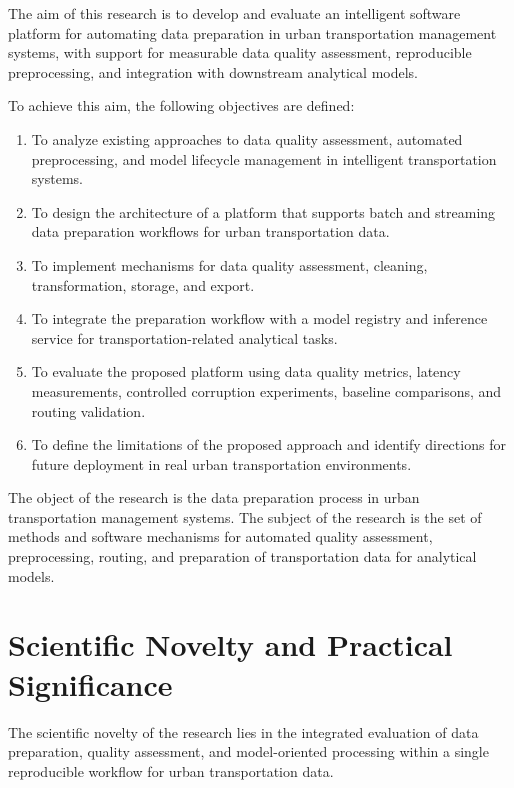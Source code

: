 The aim of this research is to develop and evaluate an intelligent software platform for automating data preparation in urban transportation management systems, with support for measurable data quality assessment, reproducible preprocessing, and integration with downstream analytical models.

To achieve this aim, the following objectives are defined:
\begin{enumerate}
  \item To analyze existing approaches to data quality assessment, automated preprocessing, and model lifecycle management in intelligent transportation systems.
  \item To design the architecture of a platform that supports batch and streaming data preparation workflows for urban transportation data.
  \item To implement mechanisms for data quality assessment, cleaning, transformation, storage, and export.
  \item To integrate the preparation workflow with a model registry and inference service for transportation-related analytical tasks.
  \item To evaluate the proposed platform using data quality metrics, latency measurements, controlled corruption experiments, baseline comparisons, and routing validation.
  \item To define the limitations of the proposed approach and identify directions for future deployment in real urban transportation environments.
\end{enumerate}

The object of the research is the data preparation process in urban transportation management systems. The subject of the research is the set of methods and software mechanisms for automated quality assessment, preprocessing, routing, and preparation of transportation data for analytical models.

\section{Scientific Novelty and Practical Significance}

The scientific novelty of the research lies in the integrated evaluation of data preparation, quality assessment, and model-oriented processing within a single reproducible workflow for urban transportation data.


